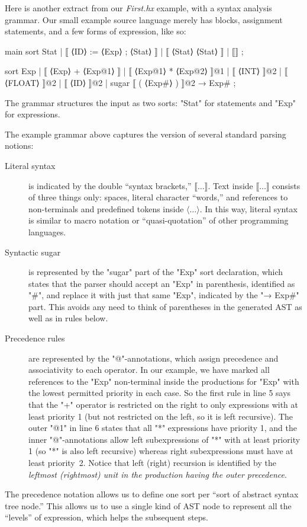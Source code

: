 \documentclass[11pt]{article} %
\begin{document}
\begin{example}\label{ex:syntax}
  Here is another extract from our \emph{First.hx} example, with a syntax analysis grammar. Our
  small example source language merely has blocks, assignment statements, and a few forms of
  expression, like so:
  \begin{hacs}[xleftmargin=\parindent,xrightmargin=2em,numbers=right]
main sort Stat  | ⟦ ⟨ID⟩ := ⟨Exp⟩ ; ⟨Stat⟩ ⟧
                | ⟦ { ⟨Stat⟩ } ⟨Stat⟩ ⟧
                | ⟦⟧ ;

sort Exp  | ⟦ ⟨Exp⟩ + ⟨Exp@1⟩ ⟧
          | ⟦ ⟨Exp@1⟩ * ⟨Exp@2⟩ ⟧@1
          | ⟦ ⟨INT⟩ ⟧@2
          | ⟦ ⟨FLOAT⟩ ⟧@2
          | ⟦ ⟨ID⟩ ⟧@2
          | sugar ⟦ ( ⟨Exp#⟩ ) ⟧@2 → Exp# ;
  \end{hacs}
  The grammar structures the input as two sorts: "Stat" for statements and "Exp" for expressions.
\end{example}

The example grammar above captures the \HAX version of several standard parsing notions:
\begin{description}

\item[Literal syntax] is indicated by the double ``syntax brackets,'' $⟦…⟧$.  Text inside $⟦…⟧$
  consists of three things only: spaces, literal character ``words,'' and references to
  non-terminals and predefined tokens inside $⟨…⟩$.  In this way, literal syntax is similar to macro
  notation or ``quasi-quotation'' of other programming languages.

\item[Syntactic sugar] is represented by the "sugar" part of the "Exp" sort declaration, which
  states that the parser should accept an "Exp" in parenthesis, identified as "#", and replace it
  with just that same "Exp", indicated by the "→ Exp#" part.  This avoids any need to think of
  parentheses in the generated AST as well as in rules below.

\item[Precedence rules] are represented by the "@"-annotations, which assign precedence and
  associativity to each operator. In our example, we have marked all references to the "Exp"
  non-terminal inside the productions for "Exp" with the lowest permitted priority in each case. So
  the first rule in line 5 says that the "+" operator is restricted on the right to only expressions
  with at least priority 1 (but not restricted on the left, so it is left recursive). The outer "@1"
  in line 6 states that all "*" expressions have priority 1, and the inner "@"-annotations allow
  left subexpressions of "*" with at least priority 1 (so "*" is also left recursive) whereas right
  subexpressions must have at least priority~2. Notice that left (right) recursion is identified by
  the \emph{leftmost (rightmost) unit in the production having the outer precedence}.

\end{description}
The precedence notation allows us to define one sort per ``sort of abstract syntax tree node.''
This allows us to use a single kind of AST node to represent all the ``levels'' of expression, which
helps the subsequent steps.
\end{document}
